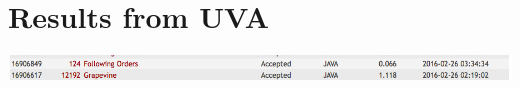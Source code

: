\documentclass[12pt]{article}
\begin{document}

\newcommand{\hmwkClass}{COS 255}
\newcommand{\hmwkSemester}{Spring 2016}

\newcommand{\hmwkAuthorName}{Lukas Leung}
\newcommand{\hmwkAuthorID}{lleung}

\newcommand{\hmwkAssignmentNum}{3}

\newcommand{\hmwkProblemNum}{0}

\newcommand{\hmwkCollaborators}{}
\thispagestyle{fancycollab}

\section{Results from UVA}
\includegraphics[width=\textwidth]{results}
\newpage

\end{document}
